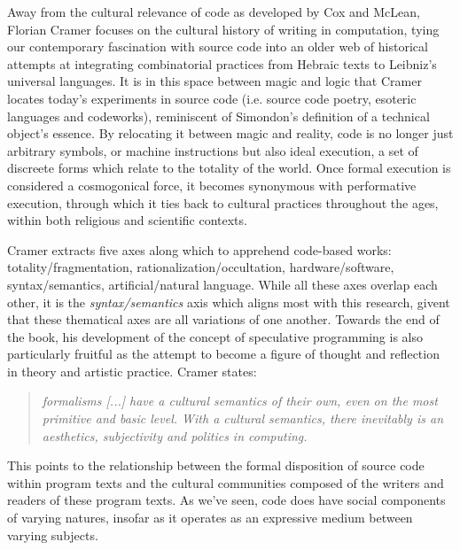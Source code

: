 Away from the cultural relevance of code as developed by Cox and McLean, Florian Cramer focuses on the cultural history of writing in computation, tying our contemporary fascination with source code into an older web of historical attempts at integrating combinatorial practices from Hebraic texts to Leibniz's universal languages\cite{cramer_words_2003}. It is in this space between magic and logic that Cramer locates today's experiments in source code (i.e. source code poetry, esoteric languages and codeworks), reminiscent of Simondon's definition of a technical object's essence\cite{simondon_du_1958}. By relocating it between magic and reality, code is no longer just arbitrary symbols, or machine instructions but also ideal execution, a set of discreete forms which relate to the totality of the world. Once formal execution is considered a cosmogonical force, it becomes synonymous with performative execution, through which it ties back to cultural practices throughout the ages, within both religious and scientific contexts.

Cramer extracts five axes along which to apprehend code-based works: totality/fragmentation, rationalization/occultation, hardware/software, syntax/semantics, artificial/natural language. While all these axes overlap each other, it is the \emph{syntax/semantics} axis which aligns most with this research, givent that these thematical axes are all variations of one another. Towards the end of the book, his development of the concept of speculative programming is also particularly fruitful as the attempt to become a figure of thought and reflection in theory and artistic practice. Cramer states:

\begin{quote}
    \emph{formalisms [...] have a cultural semantics of their own, even on the most primitive and basic level. With a cultural semantics, there inevitably is an aesthetics, subjectivity and politics in computing.}\cite{cramer_words_2003}
\end{quote}

This points to the relationship between the formal disposition of source code within program texts and the cultural communities composed of the writers and readers of these program texts. As we've seen, code does have social components of varying natures, insofar as it operates as an expressive medium between varying subjects.

